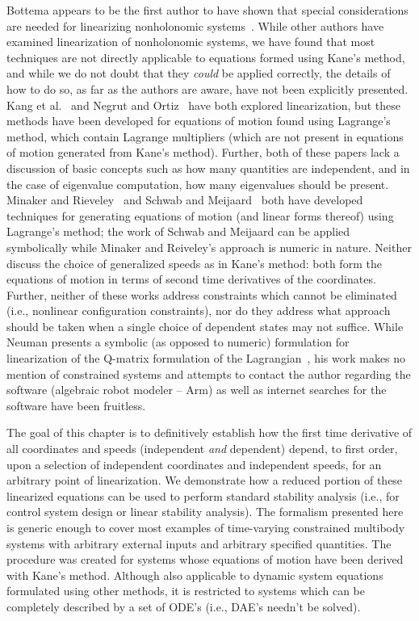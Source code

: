 Bottema appears to be the first author to have shown that special
considerations are needed for linearizing nonholonomic
systems~\cite{Bottema1949}. While other authors have examined linearization of
nonholonomic systems, we have found that most techniques are not directly
applicable to equations formed using Kane's method, and while we do not doubt
that they \textit{could} be applied correctly, the details of how to do so, as
far as the authors are aware, have not been explicitly presented. Kang et
al.~\cite{Kang2003} and Negrut and Ortiz~\cite{Negrut2006} have both explored
linearization, but these methods have been developed for equations of motion
found using Lagrange's method, which contain Lagrange multipliers (which are
not present in equations of motion generated from Kane's method). Further, both
of these papers lack a discussion of basic concepts such as how many quantities
are independent, and in the case of eigenvalue computation, how many
eigenvalues should be present. Minaker and Rieveley~\cite{Minaker2010} and
Schwab and Meijaard~\cite{Schwab2003} both have developed techniques for
generating equations of motion (and linear forms thereof) using Lagrange's
method; the work of Schwab and Meijaard can be applied symbolically while
Minaker and Reiveley's approach is numeric in nature. Neither discuss the
choice of generalized speeds as in Kane's method: both form the equations of
motion in terms of second time derivatives of the coordinates.  Further,
neither of these works address constraints which cannot be eliminated (i.e.,
nonlinear configuration constraints), nor do they address what approach should
be taken when a single choice of dependent states may not suffice. While Neuman
presents a symbolic (as opposed to numeric) formulation for linearization of
the Q-matrix formulation of the Lagrangian~\cite{Neuman1984}, his work makes no
mention of constrained systems and attempts to contact the author regarding the
software (algebraic robot modeler -- Arm) as well as internet searches for the
software have been fruitless.

The goal of this chapter is to definitively establish how the first time
derivative of all coordinates and speeds (independent \textit{and} dependent)
depend, to first order, upon a selection of independent coordinates and
independent speeds, for an arbitrary point of linearization. We demonstrate how
a reduced portion of these linearized equations can be used to perform standard
stability analysis (i.e., for control system design or linear stability
analysis). The formalism presented here is generic enough to cover most
examples of time-varying constrained multibody systems with arbitrary external
inputs and arbitrary specified quantities.  The procedure was created for
systems whose equations of motion have been derived with Kane's method.
Although also applicable to dynamic system equations formulated using other
methods, it is restricted to systems which can be completely described by a set
of ODE's (i.e., DAE's needn't be solved).

